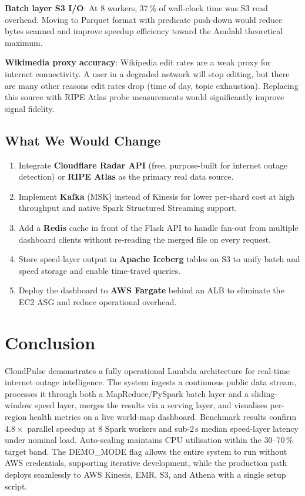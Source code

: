 \documentclass[conference]{IEEEtran}
\begin{document}
\textbf{Batch layer S3 I/O}: At 8 workers, 37\,\% of wall-clock time was S3
read overhead. Moving to Parquet format with predicate push-down would reduce
bytes scanned and improve speedup efficiency toward the Amdahl theoretical maximum.

\textbf{Wikimedia proxy accuracy}: Wikipedia edit rates are a weak proxy for
internet connectivity. A user in a degraded network will stop editing, but there
are many other reasons edit rates drop (time of day, topic exhaustion). Replacing
this source with RIPE Atlas probe measurements would significantly improve
signal fidelity.

\subsection{What We Would Change}

\begin{enumerate}
  \item Integrate \textbf{Cloudflare Radar API} (free, purpose-built for internet
    outage detection) or \textbf{RIPE Atlas} as the primary real data source.
  \item Implement \textbf{Kafka} (MSK) instead of Kinesis for lower per-shard
    cost at high throughput and native Spark Structured Streaming support.
  \item Add a \textbf{Redis} cache in front of the Flask API to handle
    fan-out from multiple dashboard clients without re-reading the merged file
    on every request.
  \item Store speed-layer output in \textbf{Apache Iceberg} tables on S3 to
    unify batch and speed storage and enable time-travel queries.
  \item Deploy the dashboard to \textbf{AWS Fargate} behind an ALB to eliminate
    the EC2 ASG and reduce operational overhead.
\end{enumerate}

\section{Conclusion}

CloudPulse demonstrates a fully operational Lambda architecture for real-time
internet outage intelligence. The system ingests a continuous public data stream,
processes it through both a MapReduce/PySpark batch layer and a sliding-window
speed layer, merges the results via a serving layer, and visualises per-region
health metrics on a live world-map dashboard. Benchmark results confirm
$4.8\times$ parallel speedup at 8 Spark workers and sub-2\,s median speed-layer
latency under nominal load. Auto-scaling maintains CPU utilisation within the
30--70\,\% target band. The DEMO\_MODE flag allows the entire system to run
without AWS credentials, supporting iterative development, while the production
path deploys seamlessly to AWS Kinesis, EMR, S3, and Athena with a single setup
script.
\end{document}
